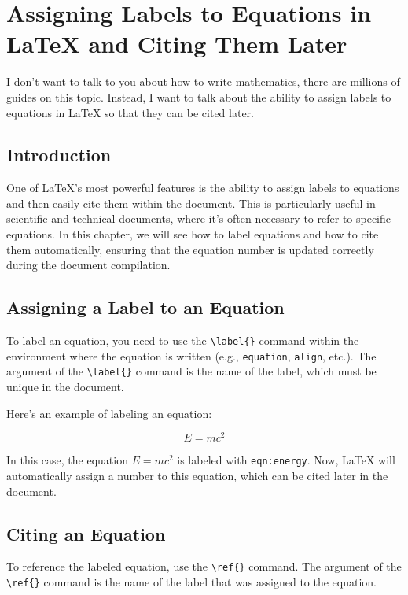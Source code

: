 \chapter[Advanced Mathematics]{Assigning Labels to Equations in LaTeX and Citing Them Later}

I don’t want to talk to you about how to write mathematics, there are millions of guides on this topic. Instead, I want to talk about the ability to assign labels to equations in LaTeX so that they can be cited later.

\section{Introduction}

One of LaTeX's most powerful features is the ability to assign labels to equations and then easily cite them within the document. This is particularly useful in scientific and technical documents, where it's often necessary to refer to specific equations. In this chapter, we will see how to label equations and how to cite them automatically, ensuring that the equation number is updated correctly during the document compilation.

\section{Assigning a Label to an Equation}

To label an equation, you need to use the \verb|\label{}| command within the environment where the equation is written (e.g., \verb|equation|, \verb|align|, etc.). The argument of the \verb|\label{}| command is the name of the label, which must be unique in the document.

Here’s an example of labeling an equation:

\begin{equation}
	E = mc^2
	\label{eqn:energy}
\end{equation}

In this case, the equation \( E = mc^2 \) is labeled with \texttt{eqn:energy}. Now, LaTeX will automatically assign a number to this equation, which can be cited later in the document.

\section{Citing an Equation}

To reference the labeled equation, use the \verb|\ref{}| command. The argument of the \verb|\ref{}| command is the name of the label that was assigned to the equation.

